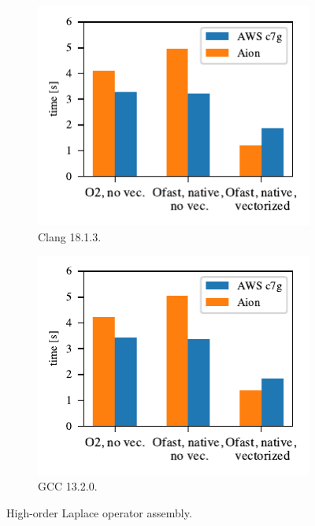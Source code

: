 \begin{figure}
    \begin{subfigure}{.5\textwidth}
        \centering
        \includegraphics{chapters/chp1/graphics/kernel_plots/local_operator_clang_deg8.pdf}
        \caption{Clang 18.1.3.}
        \label{fig:local-clang-deg8}
    \end{subfigure}%
    \begin{subfigure}{.5\textwidth}
        \centering
        \includegraphics{chapters/chp1/graphics/kernel_plots/local_operator_gcc_deg8.pdf}
        \caption{GCC 13.2.0.}
        \label{fig:local-gcc-deg8}
    \end{subfigure}
    \caption{High-order Laplace operator assembly.}
    \label{fig:local-deg8}
\end{figure}

